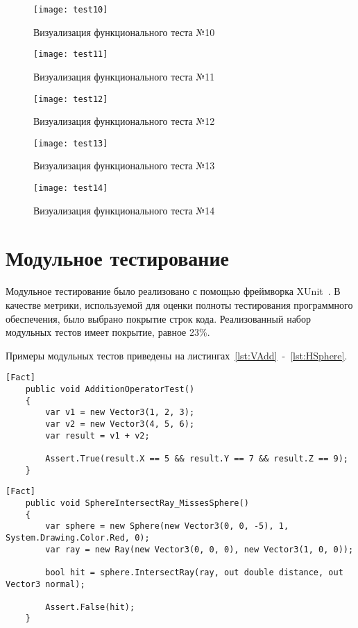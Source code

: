 \begin{figure}[H]
	\centering
	\texttt{[image: test10]}
	\caption{Визуализация функционального теста №10}
	\label{fig:test10}
\end{figure}
\begin{figure}[H]
	\centering
	\texttt{[image: test11]}
	\caption{Визуализация функционального теста №11}
	\label{fig:test11}
\end{figure}
\begin{figure}[H]
	\centering
	\texttt{[image: test12]}
	\caption{Визуализация функционального теста №12}
	\label{fig:test12}
\end{figure}
\begin{figure}[H]
	\centering
	\texttt{[image: test13]}
	\caption{Визуализация функционального теста №13}
	\label{fig:test13}
\end{figure}
\begin{figure}[H]
	\centering
	\texttt{[image: test14]}
	\caption{Визуализация функционального теста №14}
	\label{fig:test14}
\end{figure}

\section{Модульное тестирование}
Модульное тестирование было реализовано с помощью фреймворка XUnit~\cite{XUnit}. В качестве метрики, используемой для оценки полноты тестирования программного обеспечения, было выбрано покрытие строк кода. Реализованный набор модульных тестов имеет покрытие, равное 23\%.

Примеры модульных тестов приведены на листингах~\ref{lst:VAdd}~-~\ref{lst:HSphere}.
\clearpage
\begin{center}
	\begin{lstlisting}[label={lst:VAdd}, captionpos={t}, caption={Пример модульного теста для сложения двух векторов}]
	[Fact]
	public void AdditionOperatorTest()
	{
		var v1 = new Vector3(1, 2, 3);
		var v2 = new Vector3(4, 5, 6);
		var result = v1 + v2;
		
		Assert.True(result.X == 5 && result.Y == 7 && result.Z == 9);
	}
	\end{lstlisting}
\end{center}

\begin{center}
	\begin{lstlisting}[label={lst:HSphere}, captionpos={t}, caption={Пример модульного теста для неуспешного поиска пересечения луча со сферой}]
	[Fact]
	public void SphereIntersectRay_MissesSphere()
	{
		var sphere = new Sphere(new Vector3(0, 0, -5), 1, System.Drawing.Color.Red, 0);
		var ray = new Ray(new Vector3(0, 0, 0), new Vector3(1, 0, 0));
		
		bool hit = sphere.IntersectRay(ray, out double distance, out Vector3 normal);
		
		Assert.False(hit);
	}
	\end{lstlisting}
\end{center}

